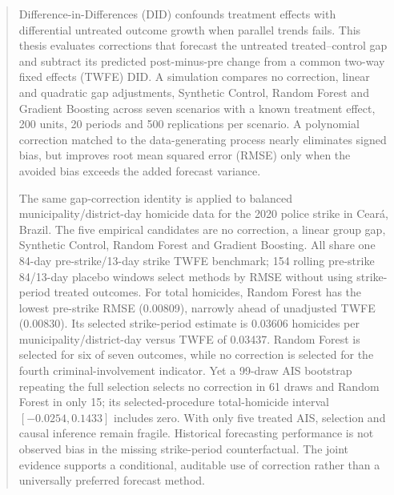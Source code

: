\begin{abstract}
Difference-in-Differences (DID) confounds treatment effects with differential untreated outcome growth when parallel trends fails. This thesis evaluates corrections that forecast the untreated treated--control gap and subtract its predicted post-minus-pre change from a common two-way fixed effects (TWFE) DID. A simulation compares no correction, linear and quadratic gap adjustments, Synthetic Control, Random Forest and Gradient Boosting across seven scenarios with a known treatment effect, 200 units, 20 periods and 500 replications per scenario. A polynomial correction matched to the data-generating process nearly eliminates signed bias, but improves root mean squared error (RMSE) only when the avoided bias exceeds the added forecast variance.

The same gap-correction identity is applied to balanced municipality/district-day homicide data for the 2020 police strike in Cear\'a, Brazil. The five empirical candidates are no correction, a linear group gap, Synthetic Control, Random Forest and Gradient Boosting. All share one 84-day pre-strike/13-day strike TWFE benchmark; 154 rolling pre-strike 84/13-day placebo windows select methods by RMSE without using strike-period treated outcomes. For total homicides, Random Forest has the lowest pre-strike RMSE (0.00809), narrowly ahead of unadjusted TWFE (0.00830). Its selected strike-period estimate is 0.03606 homicides per municipality/district-day versus TWFE of 0.03437. Random Forest is selected for six of seven outcomes, while no correction is selected for the fourth criminal-involvement indicator. Yet a 99-draw AIS bootstrap repeating the full selection selects no correction in 61 draws and Random Forest in only 15; its selected-procedure total-homicide interval $[-0.0254,0.1433]$ includes zero. With only five treated AIS, selection and causal inference remain fragile. Historical forecasting performance is not observed bias in the missing strike-period counterfactual. The joint evidence supports a conditional, auditable use of correction rather than a universally preferred forecast method.
\end{abstract}
